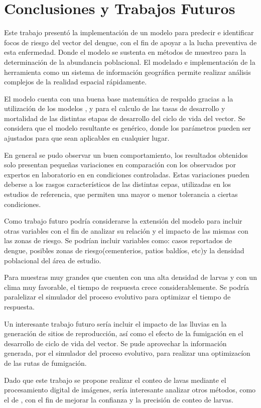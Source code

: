 \chapter{Conclusiones y Trabajos Futuros}
Este trabajo presentó la implementación de un modelo para predecir e identificar focos de riesgo
del vector del dengue, con el fin de apoyar a la lucha preventiva de esta enfermedad. Donde el
modelo se sustenta en métodos de muestreo para la determinación de la abundancia poblacional. El
modelado e implementación de la herramienta como un sistema de información geográfica permite
realizar análisis complejos de la realidad espacial rápidamente.

El modelo cuenta con una buena base matemática de respaldo gracias a la utilización de los modelos
\citet{sharpe1977reaction}, \citet{schoolfield1981non} y \citet{otero2006stochastic} para el
calculo de las tasas de desarrollo y mortalidad de las distintas etapas de desarrollo del ciclo de
vida del vector. Se considera que el modelo resultante es genérico, donde los parámetros pueden ser
ajustados para que sean aplicables en cualquier lugar.

En general se pudo observar un buen comportamiento, los resultados obtenidos solo presentan
pequeñas variaciones en comparación con los observados por expertos en laboratorio en en
condiciones controladas. Estas variaciones pueden deberse a los rasgos característicos de las
distintas cepas, utilizadas en los estudios de referencia, que permiten una mayor o menor
tolerancia a ciertas condiciones.

Como trabajo futuro podría considerarse la extensión del modelo para incluir otras variables
con el fin de analizar su relación y el impacto de las mismas con las zonas de riesgo. Se podrían
incluir variables como: casos reportados de dengue, posibles zonas de riesgo(cementerios, patios
baldíos, etc)y la densidad poblacional del área de estudio.

Para muestras muy grandes que cuenten con una alta densidad de larvas y con un clima muy
favorable, el tiempo de respuesta crece considerablemente. Se podría paralelizar el simulador del
proceso evolutivo para optimizar el tiempo de respuesta.

Un interesante trabajo futuro sería incluir el impacto de las lluvias en la generación de sitios
de reproducción, así como el efecto de la fumigación en el desarrollo de ciclo de vida del vector.
Se pude aprovechar la información generada, por el simulador del proceso evolutivo, para realizar
una optimizacíon de las rutas de fumigación.

Dado que este trabajo se propone realizar el conteo de lavas mediante el procesamiento digital de
imágenes, sería interesante analizar otros métodos, como el de \cite{gonzalez2008segmentacion},
con el fin de mejorar la confianza y la precisión de conteo de larvas.
